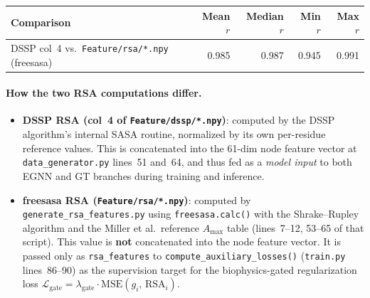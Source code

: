 \documentclass[10pt, a4paper]{article}
\newcommand{\code}[1]{\texttt{\small #1}}
\begin{document}
\begin{center}
\small
\begin{tabular}{lrrrr}
\toprule
\textbf{Comparison} & \textbf{Mean $r$} & \textbf{Median $r$} & \textbf{Min $r$} & \textbf{Max $r$} \\
\midrule
DSSP col~4 vs.\ \code{Feature/rsa/*.npy} (freesasa) & 0.985 & 0.987 & 0.945 & 0.991 \\
\bottomrule
\end{tabular}
\end{center}

\paragraph{How the two RSA computations differ.}
\begin{itemize}[noitemsep, leftmargin=1.5em]
    \item \textbf{DSSP RSA (col~4 of \code{Feature/dssp/*.npy})}: computed by the DSSP
    algorithm's internal SASA routine, normalized by its own per-residue reference values.
    This is concatenated into the 61-dim node feature vector at
    \code{data\_generator.py} lines~51 and~64, and thus fed as a \emph{model input}
    to both EGNN and GT branches during training and inference.

    \item \textbf{freesasa RSA (\code{Feature/rsa/*.npy})}: computed by
    \code{generate\_rsa\_features.py} using \code{freesasa.calc()} with the
    Shrake--Rupley algorithm and the Miller et al.\ reference $A_{\max}$ table
    (lines~7--12, 53--65 of that script). This value is \textbf{not} concatenated
    into the node feature vector. It is passed only as \code{rsa\_features}
    to \code{compute\_auxiliary\_losses()} (\code{train.py} lines~86--90) as the
    supervision target for the biophysics-gated regularization loss
    $\mathcal{L}_{\text{gate}} = \lambda_{\text{gate}}\cdot\text{MSE}(g_i,\,\text{RSA}_i)$.
\end{itemize}
\end{document}
